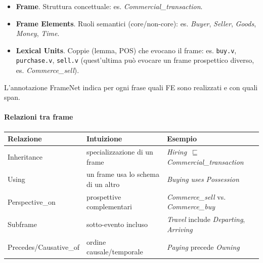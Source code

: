             \begin{itemize}
            
              \item \textbf{Frame}. Struttura concettuale: es. \emph{Commercial\_transaction}.
              
              \item \textbf{Frame Elements}. Ruoli semantici (core/non\!-core): es. \emph{Buyer}, \emph{Seller}, \emph{Goods}, \emph{Money}, \emph{Time}.
              
              \item \textbf{Lexical Units}. Coppie (lemma, POS) che evocano il frame: es. \texttt{buy.v}, \texttt{purchase.v}, \texttt{sell.v} (quest'ultima può evocare un frame prospettico diverso, es. \emph{Commerce\_sell}).
              
            \end{itemize}
            
            L'annotazione FrameNet indica per ogni frase quali FE sono realizzati e con quali span.
            
            \paragraph{Relazioni tra frame}
            
            \begin{center}
                \begin{tabular}{@{}lll@{}}
                    \toprule
                    \textbf{Relazione} & \textbf{Intuizione} & \textbf{Esempio} \\
                    \midrule
                    Inheritance & specializzazione di un frame & \emph{Hiring} \,$\sqsubseteq$\, \emph{Commercial\_transaction} \\
                    Using & un frame usa lo schema di un altro & \emph{Buying} \emph{uses} \emph{Possession} \\
                    Perspective\_on & prospettive complementari & \emph{Commerce\_sell} vs. \emph{Commerce\_buy} \\
                    Subframe & sotto\!-evento incluso & \emph{Travel} include \emph{Departing}, \emph{Arriving} \\
                    Precedes/Causative\_of & ordine causale/temporale & \emph{Paying} precede \emph{Owning} \\
                    \bottomrule
                \end{tabular}
            \end{center}
            
